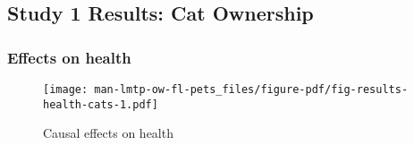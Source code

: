 \documentclass[
  singlecolumn,
  9pt]{article}
\begin{document}
\newpage{}

\subsection{Study 1 Results: Cat
Ownership}\label{study-1-results-cat-ownership}

\subsubsection{Effects on health}\label{effects-on-health}

\begin{figure}

{\centering \texttt{[image: man-lmtp-ow-fl-pets\_files/figure-pdf/fig-results-health-cats-1.pdf]}

}

\caption{\label{fig-results-health-cats}Causal effects on health}

\end{figure}

\newpage{}
\end{document}
